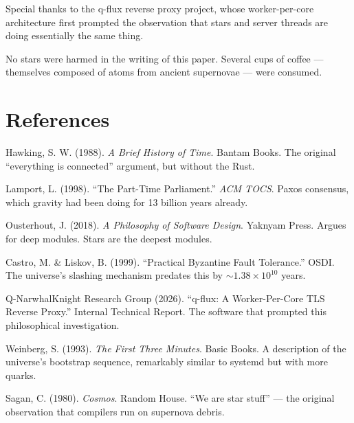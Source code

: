 \documentclass[12pt,a4paper]{article}
\begin{document}
Special thanks to the q-flux reverse proxy project, whose worker-per-core
architecture first prompted the observation that stars and server threads
are doing essentially the same thing.

No stars were harmed in the writing of this paper. Several cups of coffee
--- themselves composed of atoms from ancient supernovae --- were consumed.

\section*{References}

\begin{enumerate}[leftmargin=2cm, label={[\arabic*]}]
    \item Hawking, S. W. (1988). \textit{A Brief History of Time}. Bantam Books.
    The original ``everything is connected'' argument, but without the Rust.

    \item Lamport, L. (1998). ``The Part-Time Parliament.'' \textit{ACM TOCS}.
    Paxos consensus, which gravity had been doing for 13 billion years already.

    \item Ousterhout, J. (2018). \textit{A Philosophy of Software Design}.
    Yaknyam Press. Argues for deep modules. Stars are the deepest modules.

    \item Castro, M. \& Liskov, B. (1999). ``Practical Byzantine Fault
    Tolerance.'' OSDI. The universe's slashing mechanism predates this by
    $\sim 1.38 \times 10^{10}$ years.

    \item Q-NarwhalKnight Research Group (2026). ``q-flux: A Worker-Per-Core
    TLS Reverse Proxy.'' Internal Technical Report. The software that
    prompted this philosophical investigation.

    \item Weinberg, S. (1993). \textit{The First Three Minutes}. Basic Books.
    A description of the universe's bootstrap sequence, remarkably similar
    to systemd but with more quarks.

    \item Sagan, C. (1980). \textit{Cosmos}. Random House. ``We are star
    stuff'' --- the original observation that compilers run on supernova debris.
\end{enumerate}
\end{document}
